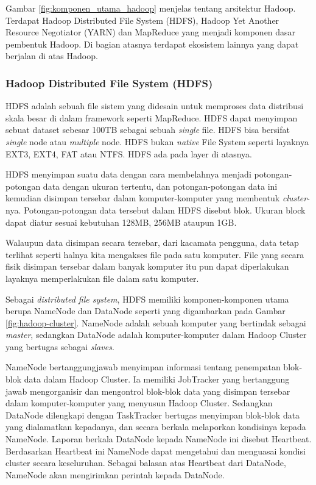 Gambar \ref{fig:komponen_utama_hadoop} menjelas tentang arsitektur Hadoop. Terdapat Hadoop Distributed File System (HDFS), Hadoop Yet Another Resource Negotiator (YARN) dan MapReduce yang menjadi komponen dasar pembentuk Hadoop. Di bagian atasnya terdapat ekosistem lainnya yang dapat berjalan di atas Hadoop.

\subsubsection{Hadoop Distributed File System (HDFS)}
HDFS adalah sebuah file sistem yang didesain untuk memproses data distribusi skala besar di dalam framework seperti MapReduce. HDFS dapat menyimpan sebuat dataset sebesar 100TB sebagai sebuah \textit{single} file.\cite{Lam:2010:HA:1965594} HDFS bisa bersifat \textit{single} node atau \textit{multiple} node. HDFS bukan \textit{native} File System seperti layaknya EXT3, EXT4, FAT atau NTFS. HDFS ada pada layer di atasnya.

HDFS menyimpan suatu data dengan cara membelahnya menjadi potongan-potongan data dengan ukuran tertentu, dan potongan-potongan data ini kemudian disimpan tersebar dalam komputer-komputer yang membentuk \textit{cluster}-nya. Potongan-potongan data tersebut dalam HDFS disebut blok. Ukuran block dapat diatur sesuai kebutuhan 128MB, 256MB ataupun 1GB.

Walaupun data disimpan secara tersebar, dari kacamata pengguna, data tetap terlihat seperti halnya kita mengakses file pada satu komputer. File yang secara fisik disimpan tersebar dalam banyak komputer itu pun dapat diperlakukan layaknya memperlakukan file dalam satu komputer.

Sebagai \textit{distributed file system}, HDFS memiliki komponen-komponen utama berupa NameNode dan DataNode seperti yang digambarkan pada Gambar \ref{fig:hadoop-cluster}. NameNode adalah sebuah komputer yang bertindak sebagai \textit{master}, sedangkan DataNode adalah komputer-komputer dalam Hadoop Cluster yang bertugas sebagai \textit{slaves}. 

NameNode bertanggungjawab menyimpan informasi tentang penempatan blok-blok data dalam Hadoop Cluster. Ia memiliki JobTracker yang bertanggung jawab mengorganisir dan mengontrol blok-blok data yang disimpan tersebar dalam komputer-komputer yang menyusun Hadoop Cluster. Sedangkan DataNode dilengkapi dengan TaskTracker bertugas menyimpan blok-blok data yang dialamatkan kepadanya, dan secara berkala melaporkan kondisinya kepada NameNode. Laporan berkala DataNode kepada NameNode ini disebut Heartbeat. Berdasarkan Heartbeat ini NameNode dapat mengetahui dan menguasai kondisi cluster secara keseluruhan. Sebagai balasan atas Heartbeat dari DataNode, NameNode akan mengirimkan perintah kepada DataNode. 


